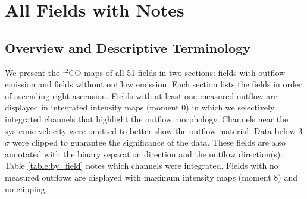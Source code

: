 \documentclass[linenumbers,twocolumn, twocolappendix]{aastex631}
\begin{document}
\vspace{5mm}








{}


\appendix

\section{All Fields with Notes} \label{sec:appendix}

\subsection{Overview and Descriptive Terminology} \label{sec:appendix:overview}
We present the $^{12}$CO maps of all 51 fields in two sections: fields with outflow emission and fields without outflow emission. Each section lists the fields in order of ascending right ascension. Fields with at least one measured outflow are displayed in integrated intensity maps (moment 0) in which we selectively integrated channels that highlight the outflow morphology. Channels near the systemic velocity were omitted to better show the outflow material. Data below 3${\sigma}$ were clipped to guarantee the significance of the data. These fields are also annotated with the binary separation direction and the outflow direction(s). Table \ref{table:by_field} notes which channels were integrated. Fields with no measured outflows are displayed with maximum intensity maps (moment 8) and no clipping. 
\end{document}
